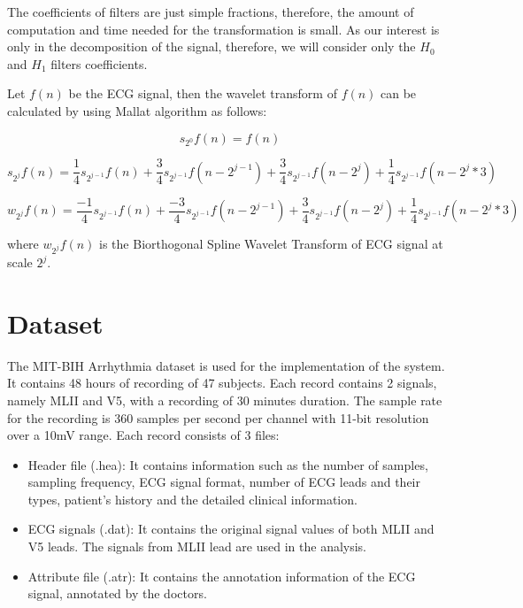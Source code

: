 The coefficients of filters are just simple fractions, therefore, the amount of computation and time needed for the transformation is small. As our interest is only in the decomposition of the signal, therefore, we will consider only the $H_0$ and $H_1$ filters coefficients.

Let $f(n)$ be the ECG signal, then the wavelet transform of $f(n)$ can be calculated by using Mallat algorithm as follows:

\begin{equation} 
{ s_{2^0}f(n) = f(n)   }
\end{equation}

\begin{equation} \label{eqn:approx}
{ s_{2^j}f(n) = \frac{1}{4}s_{2^{j-1}}f(n) + \frac{3}{4}s_{2^{j-1}}f(n-2^{j-1}) + \frac{3}{4}s_{2^{j-1}}f(n-2^{j}) + \frac{1}{4}s_{2^{j-1}}f(n-2^{j} * 3) }
\end{equation}

\begin{equation} \label{eqn:detail}
{ w_{2^j}f(n) = \frac{-1}{4}s_{2^{j-1}}f(n) + \frac{-3}{4}s_{2^{j-1}}f(n-2^{j-1}) + \frac{3}{4}s_{2^{j-1}}f(n-2^{j}) + \frac{1}{4}s_{2^{j-1}}f(n-2^{j} * 3) }
\end{equation}

where $w_{2^j}f(n)$ is the Biorthogonal Spline Wavelet Transform of ECG signal at scale $2^j$.


\section{Dataset}

The MIT-BIH Arrhythmia dataset is used for the implementation of the system. It contains 48 hours of recording of 47 subjects. Each record contains 2 signals, namely MLII and V5, with a recording of 30 minutes duration. The sample rate for the recording is 360 samples per second per channel with 11-bit resolution over a 10mV range. Each record consists of 3 files:

\begin{itemize}
	\item Header file (.hea): It contains information such as the number of samples, sampling frequency, ECG signal format, number of ECG leads and their types, patient's history and the detailed clinical information.
	
	\item ECG signals (.dat): It contains the original signal values of both MLII and V5 leads. The signals from MLII lead are used in the analysis.
	
	\item Attribute file (.atr): It contains the annotation information of the ECG signal, annotated by the doctors.
\end{itemize}


